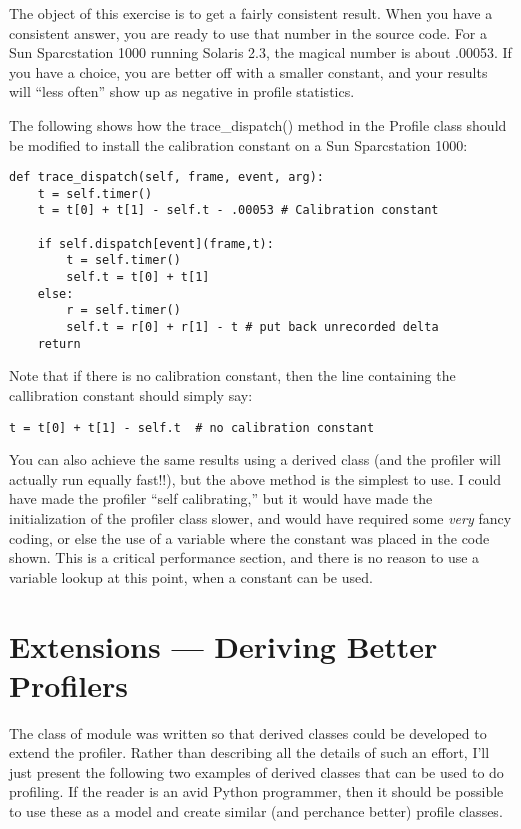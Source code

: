 The object of this exercise is to get a fairly consistent result.
When you have a consistent answer, you are ready to use that number in
the source code.  For a Sun Sparcstation 1000 running Solaris 2.3, the
magical number is about .00053.  If you have a choice, you are better
off with a smaller constant, and your results will ``less often'' show
up as negative in profile statistics.

The following shows how the trace_dispatch() method in the Profile
class should be modified to install the calibration constant on a Sun
Sparcstation 1000:

\begin{verbatim}
def trace_dispatch(self, frame, event, arg):
    t = self.timer()
    t = t[0] + t[1] - self.t - .00053 # Calibration constant

    if self.dispatch[event](frame,t):
        t = self.timer()
        self.t = t[0] + t[1]
    else:
        r = self.timer()
        self.t = r[0] + r[1] - t # put back unrecorded delta
    return
\end{verbatim}

Note that if there is no calibration constant, then the line
containing the callibration constant should simply say:

\begin{verbatim}
t = t[0] + t[1] - self.t  # no calibration constant
\end{verbatim}

You can also achieve the same results using a derived class (and the
profiler will actually run equally fast!!), but the above method is
the simplest to use.  I could have made the profiler ``self
calibrating,'' but it would have made the initialization of the
profiler class slower, and would have required some \emph{very} fancy
coding, or else the use of a variable where the constant 
was placed in the code shown.  This is a  critical
performance section, and there is no reason to use a variable lookup
at this point, when a constant can be used.


\section{Extensions --- Deriving Better Profilers}

The  class of module  was written so that
derived classes could be developed to extend the profiler.  Rather
than describing all the details of such an effort, I'll just present
the following two examples of derived classes that can be used to do
profiling.  If the reader is an avid Python programmer, then it should
be possible to use these as a model and create similar (and perchance
better) profile classes.

